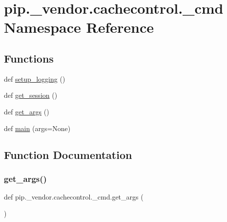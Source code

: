 \hypertarget{namespacepip_1_1__vendor_1_1cachecontrol_1_1__cmd}{}\section{pip.\+\_\+vendor.\+cachecontrol.\+\_\+cmd Namespace Reference}
\label{namespacepip_1_1__vendor_1_1cachecontrol_1_1__cmd}
\subsection*{Functions}
\begin{DoxyCompactItemize}
\item 
def \hyperlink{namespacepip_1_1__vendor_1_1cachecontrol_1_1__cmd_a48207101966f9b3f9c0da4b6dbc60d05}{setup\+\_\+logging} ()
\item 
def \hyperlink{namespacepip_1_1__vendor_1_1cachecontrol_1_1__cmd_a2e0331e2e8959284190e32952f8e79c3}{get\+\_\+session} ()
\item 
def \hyperlink{namespacepip_1_1__vendor_1_1cachecontrol_1_1__cmd_af03032666254d771c5c43ad9bb37d52f}{get\+\_\+args} ()
\item 
def \hyperlink{namespacepip_1_1__vendor_1_1cachecontrol_1_1__cmd_a1ab43897ea98315fee33c582797a4426}{main} (args=None)
\end{DoxyCompactItemize}


\subsection{Function Documentation}
\mbox{\label{namespacepip_1_1__vendor_1_1cachecontrol_1_1__cmd_af03032666254d771c5c43ad9bb37d52f}} 
\subsubsection{\texorpdfstring{get\+\_\+args()}{get\_args()}}
{\footnotesize\ttfamily def pip.\+\_\+vendor.\+cachecontrol.\+\_\+cmd.\+get\+\_\+args (\begin{DoxyParamCaption}{ }\end{DoxyParamCaption})}

